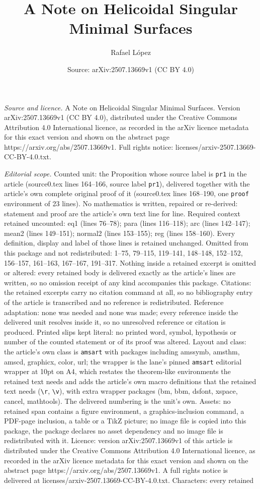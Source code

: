 \documentclass[10pt,a4paper]{amsart}
\title[A Note on Helicoidal Singular Minimal Surfaces]{A Note on Helicoidal Singular Minimal Surfaces}
\author{Rafael L\'opez}
\date{Source: arXiv:2507.13669v1 (CC BY 4.0)}
\begin{document}
\maketitle

\noindent\emph{Source and licence.} A Note on Helicoidal Singular Minimal Surfaces. Version arXiv:2507.13669v1 (CC BY 4.0), distributed under the Creative Commons Attribution 4.0 International licence, as recorded in the arXiv licence metadata for this exact version and shown on the abstract page https://arxiv.org/abs/2507.13669v1. Full rights notice: licenses/arxiv-2507.13669-CC-BY-4.0.txt.\par\smallskip

\noindent\textit{Editorial scope.} Counted unit: the Proposition whose source label is \texttt{pr1} in the article (source0.tex lines 164--166, source label \texttt{pr1}), delivered together with the article's own complete original proof of it (source0.tex lines 168--190, one \texttt{proof} environment of 23 lines). No mathematics is written, repaired or re-derived: statement and proof are the article's own text line for line. Required context retained uncounted: eq1 (lines 76--78); para (lines 116--118); arc (lines 142--147); mean2 (lines 149--151); normal2 (lines 153--155); reg (lines 158--160). Every definition, display and label of those lines is retained unchanged. Omitted from this package and not redistributed: 1--75, 79--115, 119--141, 148--148, 152--152, 156--157, 161--163, 167--167, 191--317. Nothing inside a retained excerpt is omitted or altered: every retained body is delivered exactly as the article's lines are written, so no omission receipt of any kind accompanies this package. Citations: the retained excerpts carry no citation command at all, so no bibliography entry of the article is transcribed and no reference is redistributed. Reference adaptation: none was needed and none was made; every reference inside the delivered unit resolves inside it, so no unresolved reference or citation is produced. Printed slips kept literal: no printed word, symbol, hypothesis or number of the counted statement or of its proof was altered. Layout and class: the article's own class is \texttt{amsart} with packages including amssymb, amsthm, amscd, graphicx, color, url; the wrapper is the lane's pinned \texttt{amsart} editorial wrapper at 10pt on A4, which restates the theorem-like environments the retained text needs and adds the article's own macro definitions that the retained text needs (\texttt{\textbackslash r}, \texttt{\textbackslash v}), with extra wrapper packages (bm, bbm, dsfont, xspace, cancel, mathtools). The delivered numbering is the unit's own. Assets: no retained span contains a figure environment, a graphics-inclusion command, a PDF-page inclusion, a table or a TikZ picture; no image file is copied into this package, the package declares no asset dependency and no image file is redistributed with it. Licence: version arXiv:2507.13669v1 of this article is distributed under the Creative Commons Attribution 4.0 International licence, as recorded in the arXiv licence metadata for this exact version and shown on the abstract page https://arxiv.org/abs/2507.13669v1. A full rights notice is delivered at licenses/arxiv-2507.13669-CC-BY-4.0.txt. Characters: every retained 
\end{document}

